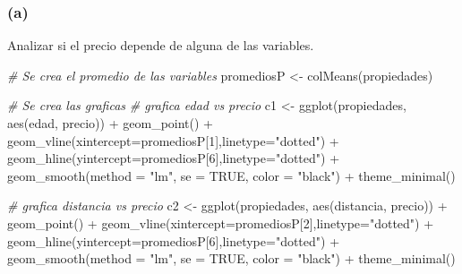 \documentclass[
]{article}
\newenvironment{Shaded}{\begin{snugshade}}{\end{snugshade}}
\newcommand{\AttributeTok}[1]{\textcolor[rgb]{0.77,0.63,0.00}{#1}}
\newcommand{\CommentTok}[1]{\textcolor[rgb]{0.56,0.35,0.01}{\textit{#1}}}
\newcommand{\ConstantTok}[1]{\textcolor[rgb]{0.00,0.00,0.00}{#1}}
\newcommand{\DecValTok}[1]{\textcolor[rgb]{0.00,0.00,0.81}{#1}}
\newcommand{\FunctionTok}[1]{\textcolor[rgb]{0.00,0.00,0.00}{#1}}
\newcommand{\NormalTok}[1]{#1}
\newcommand{\OtherTok}[1]{\textcolor[rgb]{0.56,0.35,0.01}{#1}}
\newcommand{\SpecialCharTok}[1]{\textcolor[rgb]{0.00,0.00,0.00}{#1}}
\newcommand{\StringTok}[1]{\textcolor[rgb]{0.31,0.60,0.02}{#1}}
\begin{document}
\hypertarget{a-4}{%
\subsubsection{(a)}\label{a-4}}

Analizar si el precio depende de alguna de las variables.

\begin{Shaded}
\begin{Highlighting}[]
\CommentTok{\# Se crea el promedio de las variables}
\NormalTok{promediosP }\OtherTok{\textless{}{-}} \FunctionTok{colMeans}\NormalTok{(propiedades)}

\CommentTok{\# Se crea las graficas }
\CommentTok{\# grafica edad vs precio}
\NormalTok{c1 }\OtherTok{\textless{}{-}} \FunctionTok{ggplot}\NormalTok{(propiedades, }\FunctionTok{aes}\NormalTok{(edad, precio)) }\SpecialCharTok{+} 
  \FunctionTok{geom\_point}\NormalTok{() }\SpecialCharTok{+}
  \FunctionTok{geom\_vline}\NormalTok{(}\AttributeTok{xintercept=}\NormalTok{promediosP[}\DecValTok{1}\NormalTok{],}\AttributeTok{linetype=}\StringTok{"dotted"}\NormalTok{) }\SpecialCharTok{+} 
  \FunctionTok{geom\_hline}\NormalTok{(}\AttributeTok{yintercept=}\NormalTok{promediosP[}\DecValTok{6}\NormalTok{],}\AttributeTok{linetype=}\StringTok{"dotted"}\NormalTok{) }\SpecialCharTok{+}
   \FunctionTok{geom\_smooth}\NormalTok{(}\AttributeTok{method =} \StringTok{"lm"}\NormalTok{, }\AttributeTok{se =} \ConstantTok{TRUE}\NormalTok{, }\AttributeTok{color =} \StringTok{"black"}\NormalTok{) }\SpecialCharTok{+}
  \FunctionTok{theme\_minimal}\NormalTok{()}

\CommentTok{\# grafica distancia vs precio}
\NormalTok{c2 }\OtherTok{\textless{}{-}} \FunctionTok{ggplot}\NormalTok{(propiedades, }\FunctionTok{aes}\NormalTok{(distancia, precio)) }\SpecialCharTok{+} 
  \FunctionTok{geom\_point}\NormalTok{() }\SpecialCharTok{+} 
  \FunctionTok{geom\_vline}\NormalTok{(}\AttributeTok{xintercept=}\NormalTok{promediosP[}\DecValTok{2}\NormalTok{],}\AttributeTok{linetype=}\StringTok{"dotted"}\NormalTok{) }\SpecialCharTok{+}
  \FunctionTok{geom\_hline}\NormalTok{(}\AttributeTok{yintercept=}\NormalTok{promediosP[}\DecValTok{6}\NormalTok{],}\AttributeTok{linetype=}\StringTok{"dotted"}\NormalTok{) }\SpecialCharTok{+} 
   \FunctionTok{geom\_smooth}\NormalTok{(}\AttributeTok{method =} \StringTok{"lm"}\NormalTok{, }\AttributeTok{se =} \ConstantTok{TRUE}\NormalTok{, }\AttributeTok{color =} \StringTok{"black"}\NormalTok{) }\SpecialCharTok{+}
  \FunctionTok{theme\_minimal}\NormalTok{()}


\end{Highlighting}
\end{Shaded}
\end{document}
